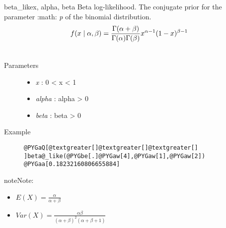 \hypertarget{pymc.distributions.beta_like}{}\begin{funcdesc}{beta\_like}{x, alpha, beta}
Beta log-likelihood. The conjugate prior for the parameter :math: \emph{p} of the binomial distribution.
\begin{gather}
\begin{split}f(x \mid \alpha, \beta) = \frac{\Gamma(\alpha + \beta)}{\Gamma(\alpha) \Gamma(\beta)} x^{\alpha - 1} (1 - x)^{\beta - 1}\end{split}\notag\\\begin{split}\end{split}\notag
\end{gather}\begin{description}
\item[Parameters] \leavevmode\begin{itemize}
\item {} 
\emph{x} : 0 \textless{} x \textless{} 1

\item {} 
\emph{alpha} : alpha \textgreater{} 0

\item {} 
\emph{beta} : beta \textgreater{} 0

\end{itemize}

\item[Example] \leavevmode
\begin{Verbatim}[commandchars=@\[\]]
@PYGaQ[@textgreater[]@textgreater[]@textgreater[] ]beta@_like(@PYGbe[.]@PYGaw[4],@PYGaw[1],@PYGaw[2])
@PYGaa[0.18232160806655884]
\end{Verbatim}

\end{description}

\begin{notice}{note}{Note:}\begin{itemize}
\item {} 
$E(X)=\frac{\alpha}{\alpha+\beta}$

\item {} 
$Var(X)=\frac{\alpha \beta}{(\alpha+\beta)^2(\alpha+\beta+1)}$

\end{itemize}
\end{notice}
\end{funcdesc}

